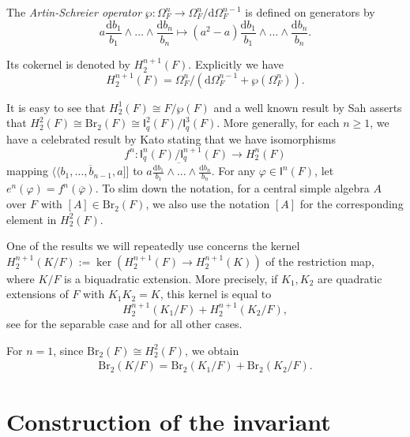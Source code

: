 \documentclass{amsart}
\numberwithin{equation}{section}
\newcommand{\qpf}[1]{\langle\!\langle #1]\!]}
\newcommand{\BrTwo}{\mathrm{Br}_2}
\newcommand{\diff}{\mathrm{d}}
\newcommand{\I}{\mathsf{I}}
\begin{document}
The \emph{Artin-Schreier operator} $\wp: \Omega_F^n \to \Omega_F^{n} / \diff \Omega_F^{n - 1}$ is defined on generators by 
\[a \frac{\diff b_1}{b_1} \wedge \ldots \wedge \frac{\diff b_n}{b_n} \mapsto (a^2 - a)\frac{\diff b_1}{b_1} \wedge \ldots \wedge \frac{\diff b_n}{b_n}.\]

Its cokernel is denoted by $H_2^{n+1}(F)$.
Explicitly we have
\[H_2^{n+1}(F) = \Omega_F^n / (\diff \Omega_F^{n-1} + \wp(\Omega_F^n)).\]

It is easy to see that $H_2^1(F) \cong F / \wp(F)$ and a well known result by Sah \cite[Theorem 2 (ii)]{Sah_SBFandQF} asserts that $H_2^2(F) \cong \BrTwo(F) \cong \I_q^2(F) / \I_q^3(F)$.
More generally, for each $n \geq 1$, we have a celebrated result by Kato \cite{Kat1} stating that we have isomorphisms
\[f^n: \I_q^n(F) / \I_q^{n+1}(F) \to H_2^n(F) \]
mapping $\overline{\qpf{b_1, \ldots, b_{n-1}, a}}$ to $\overline{a \frac{\diff b_1}{b_1} \wedge \ldots \wedge \frac{\diff b_n}{b_n}}$.
For any $\varphi \in \I^n(F)$, let $e^n(\varphi) = f^n(\overline{\varphi})$.
To slim down the notation, for a central simple algebra $A$ over $F$ with $[A] \in \BrTwo(F)$, we also use the notation $[A]$ for the corresponding element in $H_2^2(F)$.

One of the results we will repeatedly use concerns the kernel $H_2^{n+1}(K/F) := \ker(H_2^{n+1}(F) \to H_2^{n+1}(K))$ of the restriction map, where $K / F$ is a biquadratic extension.
More precisely, if $K_1, K_2$ are quadratic extensions of $F$ with $K_1K_2 = K$, this kernel is equal to
\[H_2^{n+1}(K_1 / F) + H_2^{n+1}(K_2 / F),\]
see \cite[Theorem 20]{AravireJacob_GradedKernelBiquadraticSeparable} for the separable case and \cite[Proposition 2 and 3]{AravireLaghribiMultiQuadratic} for all other cases.

For $n = 1$, since $\BrTwo(F) \cong H_2^2(F)$, we obtain
\begin{align} \label{BrauerKernelBiquadratic}
	\BrTwo(K/F) = \BrTwo(K_1/F) + \BrTwo(K_2/F).
\end{align}


\section{Construction of the invariant} \label{sec_ConstructionInvariant}
\end{document}
